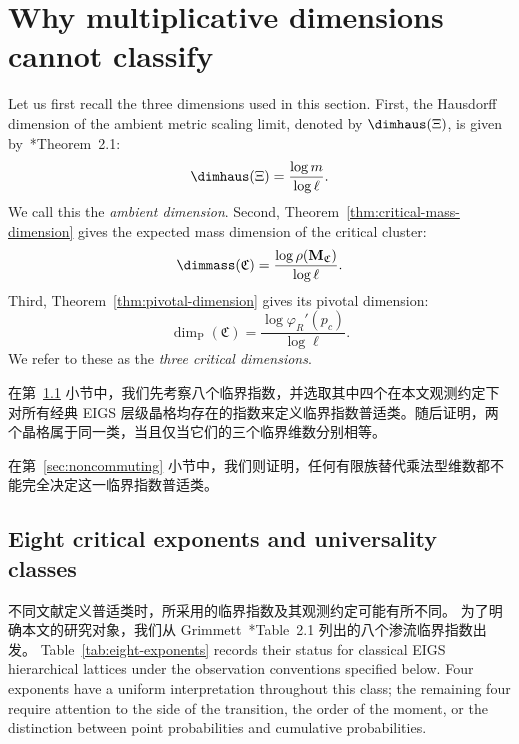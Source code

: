 \section{Why multiplicative dimensions cannot classify}\label{sec:universality}\label{sec:converse-rigidity}\label{sec:three-dimensions}



Let us first recall the three dimensions used in this section.
First, the Hausdorff dimension of the ambient metric scaling limit, denoted by $\dimhaus(\Xi)$, is given by~\cite{neroli2024fractal}*{Theorem~2.1}:
\[
 \dimhaus(\Xi)=\frac{\log m}{\log\ell}.
\]
We call this the \emph{ambient dimension}.
Second, Theorem~\ref{thm:critical-mass-dimension} gives the expected mass dimension of the critical cluster:
\[
 \dimmass(\mathfrak C)=\frac{\log\rho(\mathbf M_{\mathfrak C})}{\log\ell}.
\]
Third, Theorem~\ref{thm:pivotal-dimension} gives its pivotal dimension:
\[
 \dim_{\mathrm P}(\mathfrak C)=\frac{\log\varphi_R'(p_c)}{\log\ell}.
\]
We refer to these as the \emph{three critical dimensions}.


在第~\ref{sec:static-class} 小节中，我们先考察八个临界指数，并选取其中四个在本文观测约定下对所有经典 EIGS 层级晶格均存在的指数来定义临界指数普适类。随后证明，两个晶格属于同一类，当且仅当它们的三个临界维数分别相等。

在第~\ref{sec:noncommuting} 小节中，我们则证明，任何有限族替代乘法型维数都不能完全决定这一临界指数普适类。











\subsection{Eight critical exponents and universality classes}\label{sec:static-class}


不同文献定义普适类时，所采用的临界指数及其观测约定可能有所不同。
为了明确本文的研究对象，我们从 Grimmett~\cite{grimmett2014criticality}*{Table~2.1} 列出的八个渗流临界指数出发。
Table~\ref{tab:eight-exponents} records their status for classical EIGS hierarchical lattices under the observation conventions specified below.
Four exponents have a uniform interpretation throughout this class; the remaining four require attention to the side of the transition, the order of the moment, or the distinction between point probabilities and cumulative probabilities.

